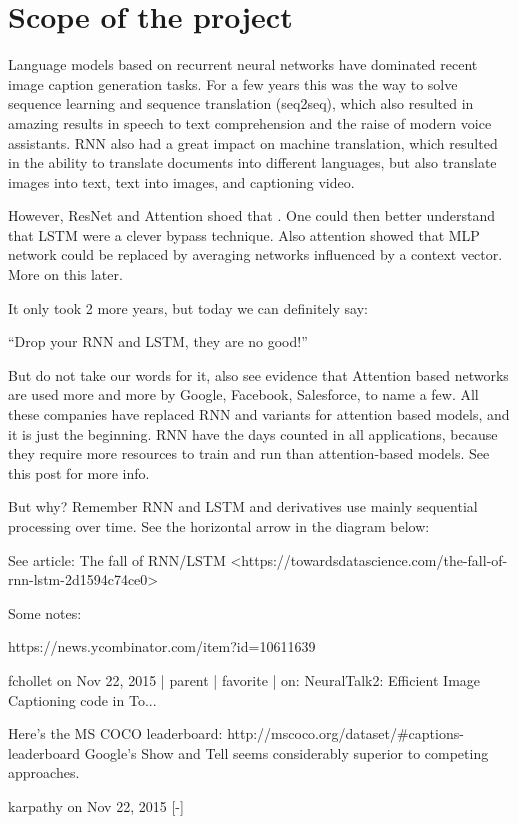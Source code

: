 \chapter{Scope of the project}
\label{ch:scope}

Language models based on recurrent neural networks have dominated recent image caption generation tasks.
For a few years this was the way to solve sequence learning and sequence translation (seq2seq), which also resulted in amazing results in speech to text comprehension and the raise of modern voice assistants. RNN also had a great impact on machine translation, which resulted in the ability to translate documents into different languages, but also translate images into text, text into images, and captioning video.

However, ResNet and Attention shoed that . One could then better understand that LSTM were a clever bypass technique. Also attention showed that MLP network could be replaced by averaging networks influenced by a context vector. More on this later.

It only took 2 more years, but today we can definitely say:

“Drop your RNN and LSTM, they are no good!”

But do not take our words for it, also see evidence that Attention based networks are used more and more by Google, Facebook, Salesforce, to name a few. All these companies have replaced RNN and variants for attention based models, and it is just the beginning. RNN have the days counted in all applications, because they require more resources to train and run than attention-based models. See this post for more info.

But why?
Remember RNN and LSTM and derivatives use mainly sequential processing over time. See the horizontal arrow in the diagram below:

See article: The fall of RNN/LSTM
<https://towardsdatascience.com/the-fall-of-rnn-lstm-2d1594c74ce0>


Some notes:

https://news.ycombinator.com/item?id=10611639

fchollet on Nov 22, 2015 | parent | favorite | on: NeuralTalk2: Efficient Image Captioning code in To...

Here's the MS COCO leaderboard: http://mscoco.org/dataset/#captions-leaderboard
Google's Show and Tell seems considerably superior to competing approaches.

karpathy on Nov 22, 2015 [-]

